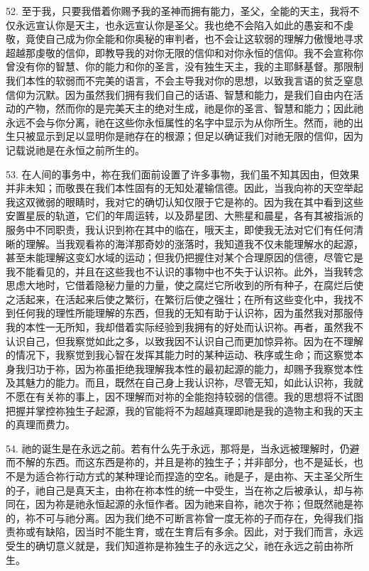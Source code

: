 52. 至于我，只要我借着你赐予我的圣神而拥有能力，圣父，全能的天主，我将不仅永远宣认你是天主，也永远宣认你是圣父。我也绝不会陷入如此的愚妄和不虔敬，竟使自己成为你全能和你奥秘的审判者，也不会让这软弱的理解力傲慢地寻求超越那虔敬的信仰，即教导我的对你无限的信仰和对你永恒的信仰。我不会宣称你曾没有你的智慧、你的能力和你的圣言，没有独生天主，我的主耶稣基督。那限制我们本性的软弱而不完美的语言，不会主导我对你的思想，以致我言语的贫乏窒息信仰为沉默。因为虽然我们拥有我们自己的话语、智慧和能力，是我们自由内在活动的产物，然而你的是完美天主的绝对生成，祂是你的圣言、智慧和能力；因此祂永远不会与你分离，祂在这些你永恒属性的名字中显示为从你所生。然而，祂的出生只被显示到足以显明你是祂存在的根源；但足以确证我们对祂无限的信仰，因为记载说祂是在永恒之前所生的。\par

53. 在人间的事务中，祢在我们面前设置了许多事物，我们虽不知其因由，但效果并非未知；而敬畏在我们本性固有的无知处灌输信德。因此，当我向祢的天空举起我这双微弱的眼睛时，我对它的确切认知仅限于它是祢的。因为我在其中看到这些安置星辰的轨道，它们的年周运转，以及昴星团、大熊星和晨星，各有其被指派的服务中不同职责，我认识到祢在其中的临在，哦天主，即使我无法对它们有任何清晰的理解。当我观看祢的海洋那奇妙的涨落时，我知道我不仅未能理解水的起源，甚至未能理解这变幻水域的运动；但我仍把握住对某个合理原因的信德，尽管它是我不能看见的，并且在这些我也不认识的事物中也不失于认识祢。此外，当我转念思虑大地时，它借着隐秘力量的力量，使之腐烂它所收到的所有种子，在腐烂后使之活起来，在活起来后使之繁衍，在繁衍后使之强壮；在所有这些变化中，我找不到任何我的理性所能理解的东西，但我的无知有助于认识祢，因为虽然我对那服侍我的本性一无所知，我却借着实际经验到我拥有的好处而认识祢。再者，虽然我不认识自己，但我察觉如此之多，以致我因不认识自己而更加惊异祢。因为在不理解的情况下，我察觉到我心智在发挥其能力时的某种运动、秩序或生命；而这察觉本身我归功于祢，因为祢虽拒绝我理解我本性的最初起源的能力，却赐予我察觉本性及其魅力的能力。而且，既然在自己身上我认识祢，尽管无知，如此认识祢，我就不愿在有关祢的事上，因不理解而对祢的全能抱持较弱的信德。我的思想将不试图把握并掌控祢独生子起源，我的官能将不为超越真理即祂是我的造物主和我的天主的真理而费力。\par

54. 祂的诞生是在永远之前。若有什么先于永远，那将是，当永远被理解时，仍避而不解的东西。而这东西是祢的，并且是祢的独生子；并非部分，也不是延长，也不是为适合祢行动方式的某种理论而捏造的空名。祂是子，是由祢、天主圣父所生的子，祂自己是真天主，由祢在祢本性的统一中受生，当在祢之后被承认，却与祢同在，因为祢是祂永恒起源的永恒作者。因为祂来自祢，祂次于祢；但既然祂是祢的，祢不可与祂分离。因为我们绝不可断言祢曾一度无祢的子而存在，免得我们指责祢或有缺陷，因当时不能生育，或在生育后有多余。因此，对于我们而言，永远受生的确切意义就是，我们知道祢是祢独生子的永远之父，祂在永远之前由祢所生。\par

